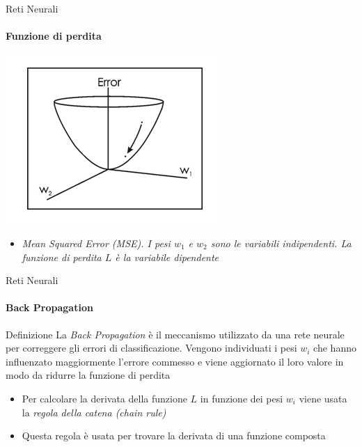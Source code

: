 \documentclass[
 ]{beamer}
\begin{document}
\begin{frame}{Reti Neurali}
    \framesubtitle{Funzione di perdita}
    
    \begin{center}
      \includegraphics[scale = 0.7]{Loss.png}
    \end{center}
  
    \smallskip
  
    \begin{itemize}
        \setlength\itemsep{1em}
        \item[] \large \emph{Mean Squared Error (MSE). I pesi $w_1$ e $w_2$ sono le variabili indipendenti. La funzione di perdita $L$ è la variabile dipendente}
    \end{itemize}       
\end{frame} 

\begin{frame}{Reti Neurali}
    \framesubtitle{Back Propagation}
    
    \begin{block}{Definizione} 
        \large La \emph{Back Propagation} è il meccanismo utilizzato da una rete neurale per correggere gli errori di classificazione. Vengono individuati i pesi $w_i$ che hanno influenzato maggiormente l'errore commesso e viene aggiornato il loro valore in modo da ridurre la funzione di perdita
    \end{block}\pause
    
    \bigskip 
    
    \begin{itemize} [<+->]
        \setlength\itemsep{2em}
        \item \large Per calcolare la derivata della funzione $L$ in funzione dei pesi $w_i$ viene usata la \emph{regola della catena (chain rule)}
        \item \large Questa regola è usata per trovare la derivata di una funzione composta
    \end{itemize}      
\end{frame}
\end{document}

